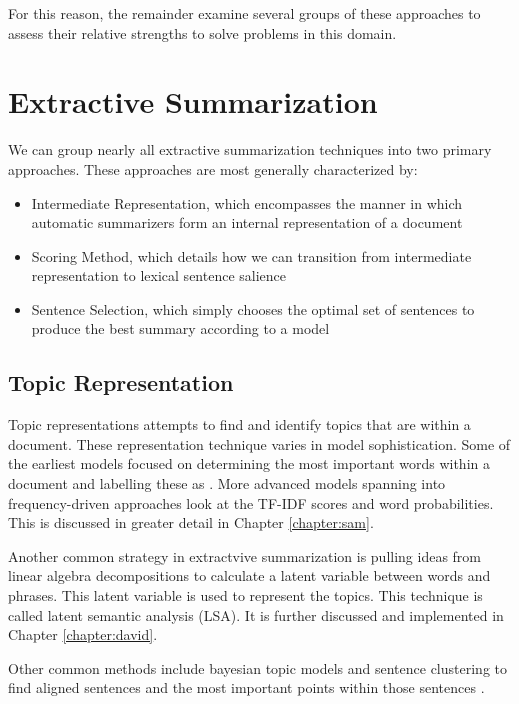 \documentclass[../writeup.tex]{subfiles}
\begin{document}
For this reason, the remainder examine several groups of these approaches to assess their relative
strengths to solve problems in this domain.

\section{Extractive Summarization}\label{intro:sec:extractive-summarization-categories}
We can group nearly all extractive summarization techniques into two primary approaches. These approaches
are most generally characterized by:
\begin{itemize}
    \item Intermediate Representation, which encompasses the manner in which automatic summarizers form an internal representation of a document
    \item Scoring Method, which details how we can transition from intermediate representation to lexical sentence salience
    \item Sentence Selection, which simply chooses the optimal set of sentences to produce the best summary according to a model
\end{itemize}

\subsection{Topic Representation}\label{intro:sec:topic-representation}

Topic representations attempts to find and identify topics that are within a document. These representation technique varies in model sophistication.
Some of the earliest models focused on determining the most important words within a document and labelling these as .
More advanced models spanning into frequency-driven approaches look at the TF-IDF scores and word probabilities. This is discussed in greater detail in Chapter \ref{chapter:sam}.

Another common strategy in extractvive summarization is pulling ideas from linear algebra decompositions to calculate a latent variable between words and phrases. This latent variable is used to represent the topics. 
This technique is called latent semantic analysis (LSA). It is further discussed and implemented in Chapter \ref{chapter:david}.

Other common methods include bayesian topic models and sentence clustering to find aligned sentences and the most important points within those sentences \autocite*{text-summarization-techniques}.
\end{document}
